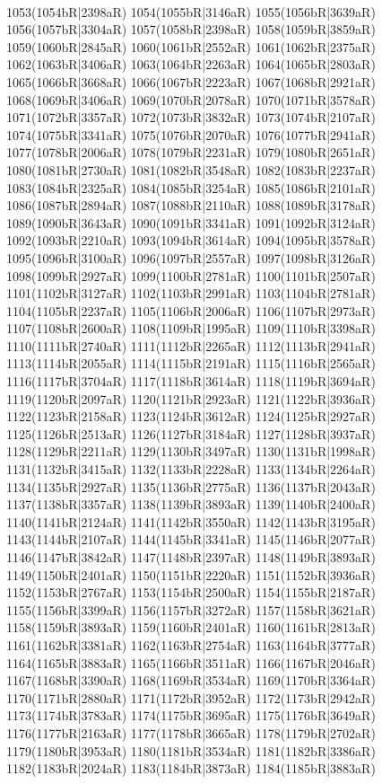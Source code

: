 \\1053(1054bR|2398aR) 1054(1055bR|3146aR) 1055(1056bR|3639aR) 1056(1057bR|3304aR) 1057(1058bR|2398aR) 1058(1059bR|3859aR) 1059(1060bR|2845aR) 1060(1061bR|2552aR) 1061(1062bR|2375aR) \\1062(1063bR|3406aR) 1063(1064bR|2263aR) 1064(1065bR|2803aR) 1065(1066bR|3668aR) 1066(1067bR|2223aR) 1067(1068bR|2921aR) 1068(1069bR|3406aR) 1069(1070bR|2078aR) 1070(1071bR|3578aR) \\1071(1072bR|3357aR) 1072(1073bR|3832aR) 1073(1074bR|2107aR) 1074(1075bR|3341aR) 1075(1076bR|2070aR) 1076(1077bR|2941aR) 1077(1078bR|2006aR) 1078(1079bR|2231aR) 1079(1080bR|2651aR) \\1080(1081bR|2730aR) 1081(1082bR|3548aR) 1082(1083bR|2237aR) 1083(1084bR|2325aR) 1084(1085bR|3254aR) 1085(1086bR|2101aR) 1086(1087bR|2894aR) 1087(1088bR|2110aR) 1088(1089bR|3178aR) \\1089(1090bR|3643aR) 1090(1091bR|3341aR) 1091(1092bR|3124aR) 1092(1093bR|2210aR) 1093(1094bR|3614aR) 1094(1095bR|3578aR) 1095(1096bR|3100aR) 1096(1097bR|2557aR) 1097(1098bR|3126aR) \\1098(1099bR|2927aR) 1099(1100bR|2781aR) 1100(1101bR|2507aR) 1101(1102bR|3127aR) 1102(1103bR|2991aR) 1103(1104bR|2781aR) 1104(1105bR|2237aR) 1105(1106bR|2006aR) 1106(1107bR|2973aR) \\1107(1108bR|2600aR) 1108(1109bR|1995aR) 1109(1110bR|3398aR) 1110(1111bR|2740aR) 1111(1112bR|2265aR) 1112(1113bR|2941aR) 1113(1114bR|2055aR) 1114(1115bR|2191aR) 1115(1116bR|2565aR) \\1116(1117bR|3704aR) 1117(1118bR|3614aR) 1118(1119bR|3694aR) 1119(1120bR|2097aR) 1120(1121bR|2923aR) 1121(1122bR|3936aR) 1122(1123bR|2158aR) 1123(1124bR|3612aR) 1124(1125bR|2927aR) \\1125(1126bR|2513aR) 1126(1127bR|3184aR) 1127(1128bR|3937aR) 1128(1129bR|2211aR) 1129(1130bR|3497aR) 1130(1131bR|1998aR) 1131(1132bR|3415aR) 1132(1133bR|2228aR) 1133(1134bR|2264aR) \\1134(1135bR|2927aR) 1135(1136bR|2775aR) 1136(1137bR|2043aR) 1137(1138bR|3357aR) 1138(1139bR|3893aR) 1139(1140bR|2400aR) 1140(1141bR|2124aR) 1141(1142bR|3550aR) 1142(1143bR|3195aR) \\1143(1144bR|2107aR) 1144(1145bR|3341aR) 1145(1146bR|2077aR) 1146(1147bR|3842aR) 1147(1148bR|2397aR) 1148(1149bR|3893aR) 1149(1150bR|2401aR) 1150(1151bR|2220aR) 1151(1152bR|3936aR) \\1152(1153bR|2767aR) 1153(1154bR|2500aR) 1154(1155bR|2187aR) 1155(1156bR|3399aR) 1156(1157bR|3272aR) 1157(1158bR|3621aR) 1158(1159bR|3893aR) 1159(1160bR|2401aR) 1160(1161bR|2813aR) \\1161(1162bR|3381aR) 1162(1163bR|2754aR) 1163(1164bR|3777aR) 1164(1165bR|3883aR) 1165(1166bR|3511aR) 1166(1167bR|2046aR) 1167(1168bR|3390aR) 1168(1169bR|3534aR) 1169(1170bR|3364aR) \\1170(1171bR|2880aR) 1171(1172bR|3952aR) 1172(1173bR|2942aR) 1173(1174bR|3783aR) 1174(1175bR|3695aR) 1175(1176bR|3649aR) 1176(1177bR|2163aR) 1177(1178bR|3665aR) 1178(1179bR|2702aR) \\1179(1180bR|3953aR) 1180(1181bR|3534aR) 1181(1182bR|3386aR) 1182(1183bR|2024aR) 1183(1184bR|3873aR) 1184(1185bR|3883aR) 